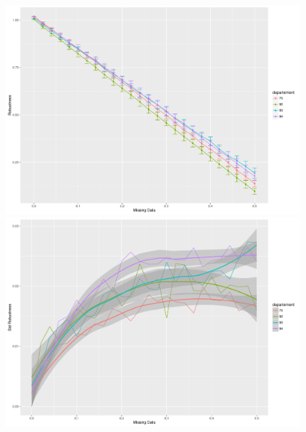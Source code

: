 \begin{figure}
\centering
\includegraphics[width=\textwidth]{Figures/RobustnessDiscrepancy/alldeps_rob_renormindics.pdf}
\includegraphics[width=\textwidth]{Figures/RobustnessDiscrepancy/alldeps_robsd_renormindics.pdf}

\end{figure}
